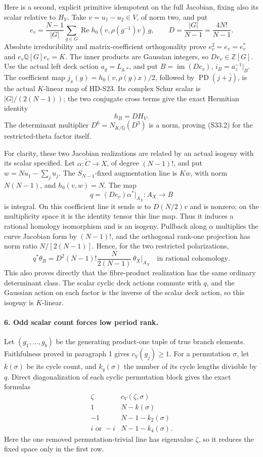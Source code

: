 Here is a second, explicit primitive idempotent on the full
Jacobian, fixing also its scalar relative to \(H_V\). Take
\(v=u_1-u_2\in V\), of norm two, and put
\[
 e_v=\frac{N-1}{|G|}\sum_{g\in G}
       \operatorname{Re}h_0(v,\rho(g^{-1})v)\,g,
 \qquad D=\frac{|G|}{N-1}=\frac{4N!}{N-1}.
 \tag{S33.8}
\]
Absolute irreducibility and matrix-coefficient orthogonality prove
\(e_v^2=e_v=e_v^*\) and \(e_v\mathbb Q[G]e_v=K\).
The inner products are Gaussian integers, so \(De_v\in\mathbb Z[G]\).
Use the actual left deck action \(a_g=L_{g,*}\), and put
\(B=\operatorname{im}(De_v)\), \(i_B=a_z^{-1}|_B\).
The coefficient map \(j_x(g)=h_0(v,\rho(g)x)/2\), followed by
\(\operatorname{PD}(j+\bar j)\), is the actual \(K\)-linear
map of HD-S23. Its complex Schur scalar is \(|G|/(2(N-1))\);
the two conjugate cross terms give the exact Hermitian identity
\[
                         h_B=D H_V.                       \tag{S33.9}
\]
The determinant multiplier \(D^6=N_{K/\mathbb Q}(D^3)\) is
a norm, proving (S33.2) for the restricted-theta factor itself.

For clarity, these two Jacobian realizations are related by an
actual isogeny with its scalar specified. Let
\(\alpha:\widetilde C\to X\), of degree \((N-1)!\), and put
\(w=Nu_1-\sum_ju_j\). The \(S_{N-1}\)-fixed augmentation
line is \(Kw\), with norm \(N(N-1)\), and
\(h_0(v,w)=N\). The map
\[
                  q=(De_v)\alpha^*|_{A_X}:A_X\to B
\]
is integral. On this coefficient line it sends \(w\) to
\(D(N/2)v\) and is nonzero; on the multiplicity space it is
the identity tensor this line map. Thus it induces a rational
homology isomorphism and is an isogeny. Pullback along \(\alpha\)
multiplies the curve Jacobian form by \((N-1)!\), and the
orthogonal rank-one projection has norm ratio
\(N/[2(N-1)]\). Hence, for the two restricted polarizations,
\[
 q^*\theta_B
     =D^2 (N-1)!\frac{N}{2(N-1)}\,\theta_X|_{A_X}
                   \quad\text{in rational cohomology}.     \tag{S33.10}
\]
This also proves directly that the fibre-product realization has
the same ordinary determinant class. The scalar cyclic deck actions commute
with \(q\), and the Gaussian action on each factor is the inverse
of the scalar deck action, so this isogeny is \(K\)-linear.

\paragraph{6. Odd scalar count forces low period rank.}
Let \((g_1,\ldots,g_b)\) be the generating product-one tuple of
true branch elements. Faithfulness proved in paragraph 1 gives
\(c_V(g_j)\ge1\). For a permutation \(\sigma\), let \(k(\sigma)\)
be its cycle count, and \(k_q(\sigma)\) the number of its cycle
lengths divisible by \(q\). Direct diagonalization of each cyclic
permutation block gives the exact formulas
\[
\begin{array}{c|c}
 \zeta&c_V(\zeta,\sigma)\\\hline
 1&N-k(\sigma)\\
 -1&N-1-k_2(\sigma)\\
 i\text{ or }-i&N-1-k_4(\sigma).
\end{array}
 \tag{S33.11}
\]
Here the one removed permutation-trivial line has eigenvalue
\(\zeta\), so it reduces the fixed space only in the first row.

